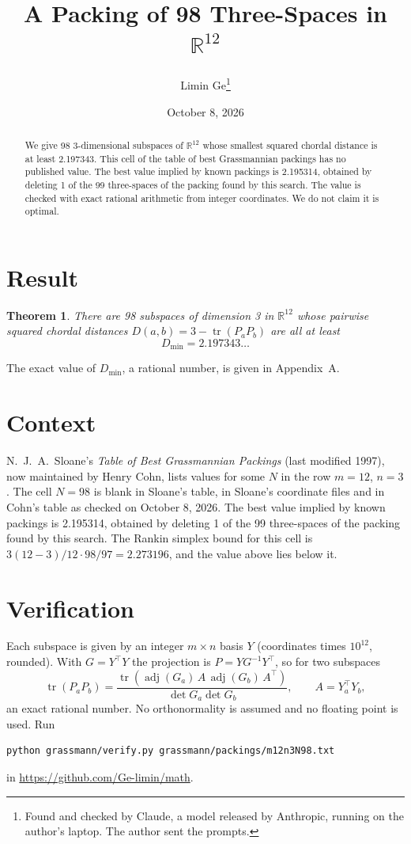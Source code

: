 \documentclass[11pt,a4paper]{article}
\title{A Packing of 98 Three-Spaces in $\mathbb{R}^{12}$}
\author{Limin Ge\thanks{Found and checked by Claude, a model released by Anthropic, running on the author's laptop. The author sent the prompts.}}
\date{October 8, 2026}
\newtheorem*{theorem}{Theorem}
\begin{document}
\maketitle
\begin{abstract}
We give 98 3-dimensional subspaces of $\mathbb{R}^{12}$ whose smallest squared chordal distance is at least 2.197343. This cell of the table of best Grassmannian packings has no published value. The best value implied by known packings is 2.195314, obtained by deleting 1 of the 99 three-spaces of the packing found by this search. The value is checked with exact rational arithmetic from integer coordinates. We do not claim it is optimal.
\end{abstract}

\section{Result}
\begin{theorem}
There are 98 subspaces of dimension 3 in $\mathbb{R}^{12}$ whose pairwise squared chordal distances $D(a,b) = 3 - \operatorname{tr}(P_aP_b)$ are all at least
\[ D_{\min} = 2.197343\ldots \]
\end{theorem}
The exact value of $D_{\min}$, a rational number, is given in Appendix~A.


\section{Context}
N.~J.~A.~Sloane's \emph{Table of Best Grassmannian Packings} (last modified 1997), now maintained by Henry Cohn, lists values for some $N$ in the row $m=12$, $n=3$. The cell $N=98$ is blank in Sloane's table, in Sloane's coordinate files and in Cohn's table as checked on October 8, 2026. The best value implied by known packings is 2.195314, obtained by deleting 1 of the 99 three-spaces of the packing found by this search. The Rankin simplex bound for this cell is $3(12-3)/12\cdot 98/97 = 2.273196$, and the value above lies below it.


\section{Verification}
Each subspace is given by an integer $m\times n$ basis $Y$ (coordinates times $10^{12}$, rounded). With $G=Y^\top Y$ the projection is $P=YG^{-1}Y^\top$, so for two subspaces
\[ \operatorname{tr}(P_aP_b)=\frac{\operatorname{tr}(\operatorname{adj}(G_a)\,A\,\operatorname{adj}(G_b)\,A^\top)}{\det G_a\det G_b},\qquad A=Y_a^\top Y_b, \]
an exact rational number. No orthonormality is assumed and no floating point is used. Run
\begin{verbatim}
python grassmann/verify.py grassmann/packings/m12n3N98.txt
\end{verbatim}
in \url{https://github.com/Ge-limin/math}.
\end{document}
